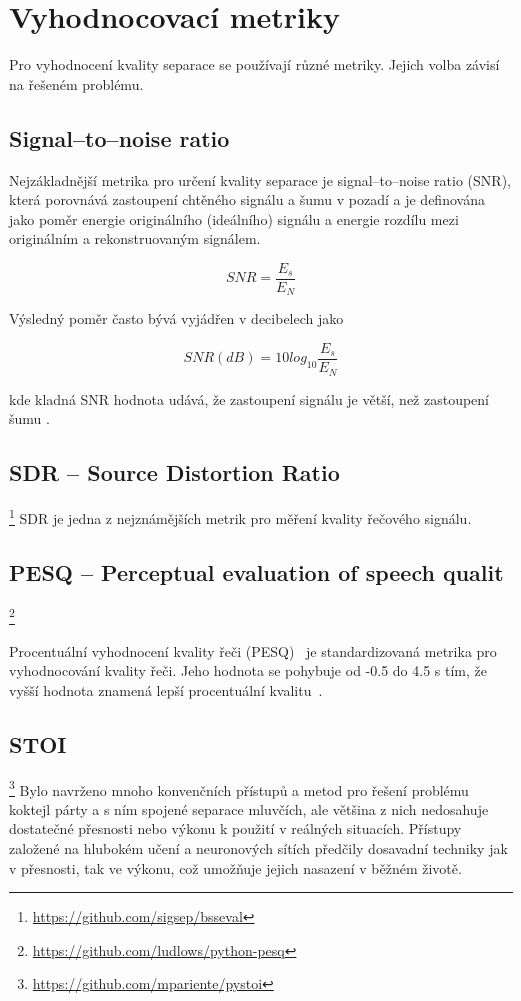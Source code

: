 \section{Vyhodnocovací metriky}
Pro vyhodnocení kvality separace se používají různé metriky. Jejich volba závisí na řešeném problému.


\subsection{Signal--to--noise ratio}
Nejzákladnější metrika pro určení kvality separace je signal--to--noise ratio (SNR), která porovnává zastoupení chtěného signálu a šumu v pozadí a je definována jako poměr energie originálního (ideálního) signálu a energie rozdílu mezi originálním a rekonstruovaným signálem.


\begin{equation}
  SNR = \frac{E_s}{E_N}
\end{equation}

Výsledný poměr často bývá vyjádřen v decibelech jako

\begin{equation}
  SNR(dB) = 10log_{10}\frac{E_s}{E_N}
\end{equation}

kde kladná SNR hodnota udává, že zastoupení signálu je větší, než zastoupení šumu .


\subsection{SDR -- Source Distortion Ratio}
\footnote{\url{https://github.com/sigsep/bsseval}}
SDR je jedna z nejznámějších metrik pro měření kvality řečového signálu.


\subsection{PESQ -- Perceptual evaluation of speech qualit}
\footnote{\url{https://github.com/ludlows/python-pesq}}

Procentuální vyhodnocení kvality řeči (PESQ)~\cite{pesq-itut} je standardizovaná metrika pro vyhodnocování kvality řeči. Jeho hodnota se pohybuje od -0.5 do 4.5 s tím, že vyšší hodnota znamená lepší procentuální kvalitu~\cite{DBLP:journals/corr/abs-1901-09146}.



\subsection{STOI}
\footnote{\url{https://github.com/mpariente/pystoi}}
Bylo navrženo mnoho konvenčních přístupů a metod pro řešení problému koktejl párty a s ním spojené separace mluvčích, ale většina z nich nedosahuje dostatečné přesnosti nebo výkonu k použití v reálných situacích. Přístupy založené na hlubokém učení a neuronových sítích předčily dosavadní techniky jak v přesnosti, tak ve výkonu, což umožňuje jejich nasazení v běžném životě.

